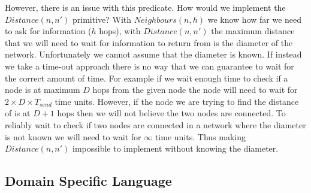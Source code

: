 However, there is an issue with this predicate. How would we implement the $Distance(n, n')$ primitive? With $Neighbours(n, h)$ we know how far we need to ask for information ($h$ hops), with $Distance(n, n')$ the maximum distance that we will need to wait for information to return from is the diameter of the network. Unfortunately we cannot assume that the diameter is known. If instead we take a time-out approach there is no way that we can guarantee to wait for the correct amount of time. For example if we wait enough time to check if a node is at maximum $D$ hops from the given node the node will need to wait for $2 \times D \times T_{send}$ time units. However, if the node we are trying to find the distance of is at $D + 1 $ hops then we will not believe the two nodes are connected. To reliably wait to check if two nodes are connected in a network where the diameter is not known we will need to wait for $\infty$ time units. Thus making $Distance(n, n')$ impossible to implement without knowing the diameter.


\subsection{Domain Specific Language}

